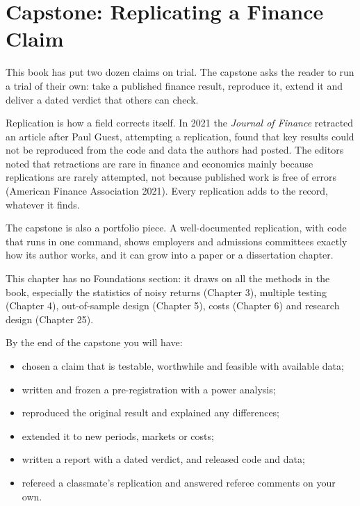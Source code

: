 \makeatletter
{}
\makeatother

\chapter{Capstone: Replicating a Finance Claim}
\label{ch:26}

This book has put two dozen claims on trial. The capstone asks the reader to run a trial of their own: take a published finance result, reproduce it, extend it and deliver a dated verdict that others can check.

Replication is how a field corrects itself. In 2021 the \emph{Journal of Finance} retracted an article after Paul Guest, attempting a replication, found that key results could not be reproduced from the code and data the authors had posted. The editors noted that retractions are rare in finance and economics mainly because replications are rarely attempted, not because published work is free of errors (American Finance Association 2021). Every replication adds to the record, whatever it finds.

The capstone is also a portfolio piece. A well-documented replication, with code that runs in one command, shows employers and admissions committees exactly how its author works, and it can grow into a paper or a dissertation chapter.

This chapter has no Foundations section: it draws on all the methods in the book, especially the statistics of noisy returns (Chapter 3), multiple testing (Chapter 4), out-of-sample design (Chapter 5), costs (Chapter 6) and research design (Chapter 25).

By the end of the capstone you will have:

\begin{itemize}
  \item chosen a claim that is testable, worthwhile and feasible with available data;
  \item written and frozen a pre-registration with a power analysis;
  \item reproduced the original result and explained any differences;
  \item extended it to new periods, markets or costs;
  \item written a report with a dated verdict, and released code and data;
  \item refereed a classmate's replication and answered referee comments on your own.
\end{itemize}


